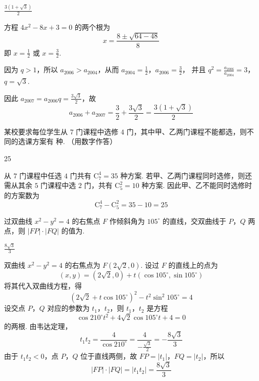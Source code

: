 \begin{answer}
\(\frac{3(1+\sqrt{3})}{2}\)
\end{answer}

\begin{solution}
方程 \(4x^{2}-8x+3=0\) 的两个根为
\[
x=\frac{8\pm\sqrt{64-48}}{8}
\]
即 \(x=\frac{1}{2}\) 或 \(x=\frac{3}{2}\).

因为 \(q>1\)，所以 \(a_{2006}>a_{2004}\)，从而
\(a_{2004}=\frac{1}{2}\)，\(a_{2006}=\frac{3}{2}\)，
并且
\(q^{2}=\frac{a_{2006}}{a_{2004}}=3\)，\(q=\sqrt{3}\).

因此 \(a_{2007}=a_{2006}q=\frac{3\sqrt{3}}{2}\)，故
\[
a_{2006}+a_{2007}=\frac{3}{2}+\frac{3\sqrt{3}}{2}=\frac{3(1+\sqrt{3})}{2}
\]
\end{solution}

\begin{problem}
某校要求每位学生从 \(7\) 门课程中选修 \(4\) 门，其中甲、乙两门课程不能都选，则不同的选课方案有\fillinblank{} 种. （用数字作答）
\end{problem}

\begin{answer}
25
\end{answer}

\begin{solution}
从 \(7\) 门课程中任选 \(4\) 门共有 \(\mathrm C_{7}^{4}=35\) 种方案. 若甲、乙两门课程同时选修，则还需从其余 \(5\) 门课程中选 \(2\) 门，共有 \(\mathrm C_{5}^{2}=10\) 种方案. 因此甲、乙不能同时选修时的方案数为
\[
\mathrm C_{7}^{4}-\mathrm C_{5}^{2}=35-10=25
\]
\end{solution}

\begin{problem}
过双曲线 \( x^{2}-y^{2}=4 \) 的右焦点 \(F\) 作倾斜角为 \( 105^{\circ} \) 的直线，交双曲线于 \(P\)，\(Q\) 两点，则 \( |FP| \cdot |FQ| \) 的值为\fillinblank{}.
\end{problem}

\begin{answer}
\(\frac{8\sqrt{3}}{3}\)
\end{answer}

\begin{solution}
双曲线 \(x^2-y^2=4\) 的右焦点为 \(F(2\sqrt2,0)\). 设过 \(F\) 的直线上的点为
\[
(x,y)=(2\sqrt2,0)+t(\cos105^{\circ},\sin105^{\circ})
\]
将其代入双曲线方程，得
\[
(2\sqrt2+t\cos105^{\circ})^2-t^2\sin^2 105^{\circ}=4
\]
设交点 \(P\)，\(Q\) 对应的参数为 \(t_1\)，\(t_2\)，则 \(t_1\)，\(t_2\) 是方程
\[
\cos210^{\circ}t^2+4\sqrt2\cos105^{\circ}t+4=0
\]
的两根. 由韦达定理，
\[
t_1t_2=\frac{4}{\cos210^{\circ}}=\frac{4}{-\frac{\sqrt3}{2}}=-\frac{8\sqrt3}{3}
\]
由于 \(t_1t_2<0\)，点 \(P\)，\(Q\) 位于直线两侧，故 \(FP=|t_1|\)，\(FQ=|t_2|\)，所以
\[
|FP|\cdot|FQ|=|t_1t_2|=\frac{8\sqrt3}{3}
\]
\end{solution}

